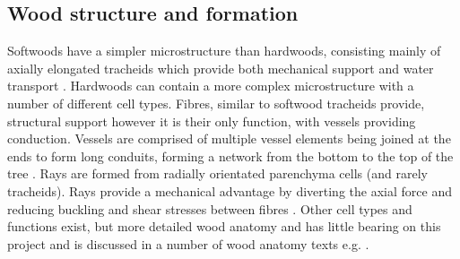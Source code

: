 \subsection{Wood structure and formation}
Softwoods have a simpler microstructure than hardwoods, consisting mainly of
axially elongated tracheids which provide both mechanical support and water
transport \citep{bowyer2007forest}. Hardwoods can contain a more complex microstructure with a number
of different cell types. Fibres, similar to softwood tracheids provide,
structural support however it is their only function, with vessels providing
conduction. Vessels are comprised of
multiple vessel elements being joined at the ends to form long conduits,
forming a network from the bottom to  the top of the tree \citep{walker1993primary}. Rays are formed from radially orientated  parenchyma cells (and rarely tracheids). Rays provide a mechanical advantage by diverting the axial force and reducing buckling and shear stresses between fibres \citep{mattheck1997wood}. Other cell types and functions exist, but more detailed wood anatomy and
has little bearing on this project and is discussed in a number of wood anatomy
texts e.g. \citet{fromm2013cellular}.
